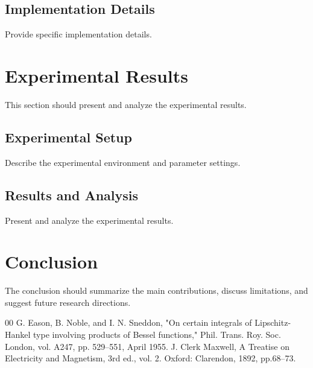 \documentclass[conference,twocolumn]{IEEEtran}
\begin{document}
\subsection{Implementation Details}
Provide specific implementation details.

\section{Experimental Results}
This section should present and analyze the experimental results.

\subsection{Experimental Setup}
Describe the experimental environment and parameter settings.

\subsection{Results and Analysis}
Present and analyze the experimental results.

\section{Conclusion}
The conclusion should summarize the main contributions, discuss limitations,
and suggest future research directions.

\begin{thebibliography}{00}
 G. Eason, B. Noble, and I. N. Sneddon, "On certain integrals of
Lipschitz-Hankel type involving products of Bessel functions," Phil. Trans. Roy. Soc. London, vol. A247, pp. 529--551, April 1955.
 J. Clerk Maxwell, A Treatise on Electricity and Magnetism, 3rd ed., vol. 2. Oxford: Clarendon, 1892, pp.68--73.
\end{thebibliography}
\end{document}
